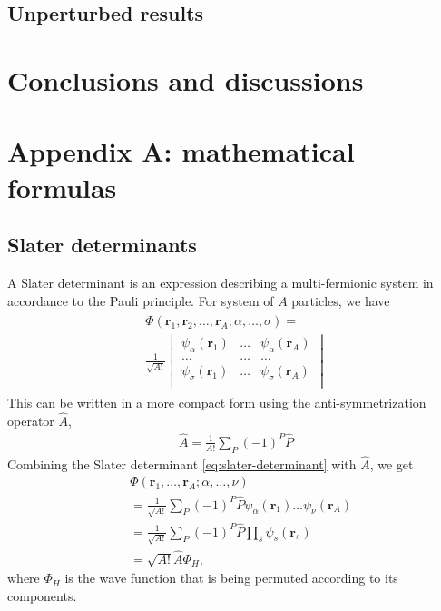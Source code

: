 \documentclass[11pt]{article}
\begin{document}
\subsection{Unperturbed results}

\section{Conclusions and discussions}

\section{Appendix A: mathematical formulas}
\subsection{Slater determinants}
A Slater determinant is an expression describing a multi-fermionic system in accordance to the Pauli principle. For system of $A$ particles, we have 
\begin{align}
	\begin{split}
		\Phi(\mathbf{r}_1,\mathbf{r}_2,\dots,\mathbf{r}_A; \alpha,\dots,\sigma) =\\
		\frac{1}{\sqrt{A!}}
		\begin{vmatrix}
			\psi_\alpha(\mathbf{r}_1) & \dots & \psi_\alpha(\mathbf{r}_A) \\
			\dots & \dots & \dots \\
			\psi_\sigma(\mathbf{r}_1) & \dots & \psi_\sigma(\mathbf{r}_A) \\
		\end{vmatrix}
	\end{split}
	\label{eq:slater-determinant}
\end{align}
This can be written in a more compact form using the anti-symmetrization operator $\hat{A}$,
\begin{align}
	\hat{A} = \frac{1}{A!}\sum_P (-1)^P \hat{P}
	\label{eq:anti-symmetrization-operator}
\end{align}
Combining the Slater determinant \eqref{eq:slater-determinant} with $\hat{A}$, we get
\begin{align}
	&\Phi(\mathbf{r}_1,\dots,\mathbf{r}_A;\alpha,\dots,\nu) \nonumber \\
	&= \frac{1}{\sqrt{A!}}\sum_P (-1)^P \hat{P}\psi_\alpha(\mathbf{r}_1)\dots\psi_\nu(\mathbf{r}_A) \nonumber \\
	&= \frac{1}{\sqrt{A!}}\sum_P (-1)^P \hat{P} \prod_s \psi_s(\mathbf{r}_s) \nonumber \\
	&= \sqrt{A!}\hat{A}\Phi_H,
	\label{eq:slater-determinant-compact}
\end{align}
where $\Phi_H$ is the wave function that is being permuted according to its components.
\end{document}

